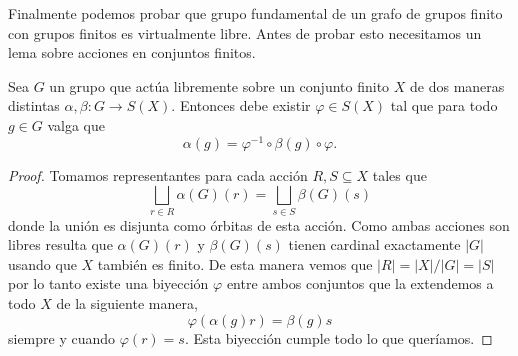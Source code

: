 \documentclass[tesis.tex]{subfiles}
\begin{document}
%

Finalmente podemos probar que grupo fundamental de un grafo de grupos finito con grupos finitos es virtualmente libre. 
Antes de probar esto necesitamos un lema sobre acciones en conjuntos finitos.

\begin{lema}\label{lema_acciones_finitas}
	Sea $G$ un grupo que actúa libremente sobre un conjunto finito $X$ de dos maneras distintas $\alpha, \beta : G \to S(X)$. 
	Entonces debe existir $\varphi \in S(X)$ tal que para todo $g \in G$ valga que 
	\[
	\alpha (g) = \varphi^{-1} \circ \beta(g) \circ \varphi.
	\]
\end{lema}
\begin{proof}
	Tomamos representantes para cada acción $R,S \subseteq X$ tales que
	\[
		\bigsqcup_{r \in R} \alpha(G) (r) = \bigsqcup_{s \in S} \beta(G) (s)
	\]
	donde la unión es disjunta como órbitas de esta acción. 
	Como ambas acciones son libres resulta que $\alpha(G)(r)$ y $\beta(G)(s)$ tienen cardinal exactamente $|G|$ usando que $X$ también es finito.
	De esta manera vemos que $|R| = |X| / |G| = |S|$ por lo tanto existe una biyección $\varphi$ entre ambos conjuntos que la extendemos a todo $X$ de la siguiente manera,
	\[
		\varphi (\alpha(g) r) = \beta(g)  s
	\]
	siempre y cuando $\varphi(r) = s$. 
	Esta biyección cumple todo lo que queríamos.
\end{proof}
\end{document}

